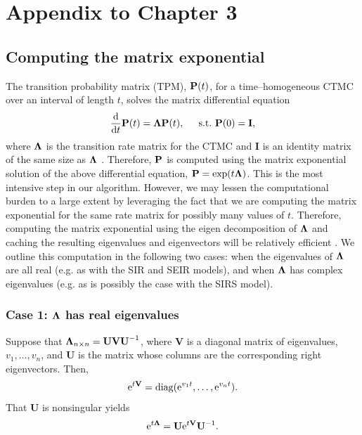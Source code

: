 \chapter{Appendix to Chapter 3}
\label{chap:appendix_ch3}

\section{Computing the matrix exponential}
\label{sec:mtx_exp}
The transition probability matrix (TPM), $ \mathbf{P}(t) $, for a time--homogeneous CTMC over an interval of length $ t $, solves the matrix differential equation \[ \frac{\mathrm{d}}{\mathrm{d} t}\mathbf{P}(t) = \boldsymbol{\Lambda}\mathbf{P}(t),\hspace{0.2in} \mathrm{s.t.\ }\mathbf{P}(0) = \mathbf{I}, \] where $ \boldsymbol{\Lambda} $ is the transition rate matrix for the CTMC and $ \mathbf{I} $ is an identity matrix of the same size as $ \boldsymbol{\Lambda} $ \citep{wilkinson2011stochastic}.  Therefore, $ \mathbf{P} $ is computed using the matrix exponential solution of the above differential equation, $ \mathbf{P} = \exp(t\boldsymbol{\Lambda}) $. This is the most intensive step in our algorithm. However, we may lessen the computational burden to a large extent by leveraging the fact that we are computing the matrix exponential for the same rate matrix for possibly many values of $ t $. Therefore, computing the matrix exponential using the eigen decomposition of $ \boldsymbol{\Lambda} $ and caching the resulting eigenvalues and eigenvectors will be relatively efficient \citep{moler2003nineteen}. We outline this computation in the following two cases: when the eigenvalues of $ \boldsymbol{\Lambda} $ are all real (e.g. as with the SIR and SEIR models), and when $ \boldsymbol{\Lambda} $ has complex eigenvalues (e.g. as is possibly the case with the SIRS model).

\subsection{Case 1: $ \boldsymbol{\Lambda} $ has real eigenvalues}
Suppose that $ \boldsymbol{\Lambda}_{n\times n} =  \mathbf{UVU}^{-1}$, where $ \mathbf{V} $ is a diagonal matrix of eigenvalues, $ v_1,\dots,v_n $, and $ \mathbf{U} $ is the matrix whose columns are the corresponding right eigenvectors. Then, \[ \mathrm{e}^{t\mathbf{V}} = \mathrm{diag}(\mathrm{e}^{v_1t},\dots,\mathrm{e}^{v_nt}). \] That $ \mathbf{U} $ is nonsingular yields \[ \mathrm{e}^{t\boldsymbol{\Lambda}} = \mathbf{U} \mathrm{e}^{t\mathbf{V}}\mathbf{U}^{-1}. \] 


